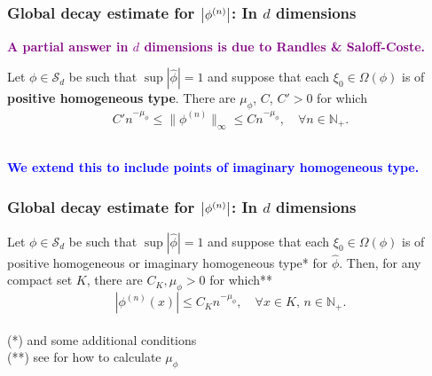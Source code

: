\documentclass{beamer}
\theoremstyle{definition}
\begin{document}
\begin{frame}
\frametitle{Global decay estimate for $\abs{\phi^{(n)}}$: In $d$ dimensions}


\begin{center}
	\textbf{\textcolor{purple}{A partial answer in $d$ dimensions is due to Randles \& Saloff-Coste. }  }
\end{center}


\begin{theorem}\label{thm:d}
	Let $\phi \in \mathcal{S}_d$ be such that $\sup | \widehat{\phi}| = 1$ and suppose that each $\xi_0 \in \Omega(\phi)$ is of \textbf{positive homogeneous type}. There are $\mu_\phi$, $C$, $C' >0$ for which 
	\begin{equation*}
	C'n^{-\mu_\phi} \leq \| \phi^{(n)} \|_\infty \leq C n^{-\mu_\phi}, \quad \forall n\in \mathbb{N}_+.
	\end{equation*}
\end{theorem}
$\,$\\

\centering\textcolor{blue}{\textbf{We extend this to include points of imaginary homogeneous type.}}


\end{frame}





\begin{frame}
\frametitle{Global decay estimate for $\abs{\phi^{(n)}}$: In $d$ dimensions}




\begin{theorem}[B, Randles -- 2021]
	\label{thm:ConvolutionPowerEstimate}
	Let $\phi\in\mathcal{S}_d$ be such that $\sup |\widehat{\phi}|=1$ and suppose that each $\xi_0\in\Omega(\phi)$ is of positive homogeneous or imaginary homogeneous type* for $\widehat{\phi}$. Then, for any compact set $K$, there are $C_K, \mu_\phi>0$ for which**
	\begin{equation*}
	\left|\phi^{(n)}(x)\right|\leq C_K n^{-\mu_\phi}, \quad \forall x\in K,\,n\in\mathbb{N}_+.
	\end{equation*}
	$\,$\\
	
	\scriptsize{(*) and some additional conditions}\\
	\scriptsize{(**) see \cite{bui2021generalized} for how to calculate $\mu_\phi$}
\end{theorem}


\end{frame}
\end{document}
